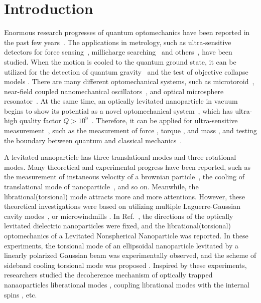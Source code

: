 \documentclass[pra,aps,superscriptaddress,showpacs,preprint]{revtex4}%
\begin{document}
\section{Introduction}
Enormous research progresses of quantum optomechanics have been reported in the past few years~\cite{AspelmeyerRmp2014,KippenbergOe2007}. The applications in metrology, such as ultra-sensitive detectors for force sensing~\cite{RanjitPra2015,RanjitPra2016}, millicharge searching~\cite{MoorePrl2014} and others~\cite{RiderPrl2016,VolpePrl2006,PedaciNphys2010}, have been studied. When the motion is cooled to the quantum ground state, it can be utilized for the detection of quantum gravity~\cite{AlbrechtPra2014} and the test of objective collapse models \cite{Bassi03}. There are many different optomechanical systems, such as microtoroid~\cite{ZhangOe2013}, near-field coupled nanomechanical oscillators~\cite{AnetsbergerNphys2009}, and optical microsphere resonator~\cite{GorodetskyJosab1999}. At the same time, an optically levitated nanoparticle in vacuum begins to show its potential as a novel optomechanical system~\cite{Romero-IsartNjp2010,ChangPnas2010,LiNphys2011,LiScience2010}, which has ultra-high quality factor $Q>10^9$~\cite{LiNphys2011,JainPrl2016}. Therefore, it can be applied for ultra-sensitive measurement~\cite{YinIjmpb2013,LiScience2010}, such as the measurement of force \cite{VolpePrl2006}, torque \cite{VolpePre2007}, and mass \cite{Zhao14}, and testing the boundary between quantum and classical mechanics~\cite{Romero-IsartPrl2011,YinPra2013,Romero-IsartPra2011,Yin2017}.

A levitated nanoparticle has three translational modes and three rotational modes.
Many theoretical and experimental progress have been reported, such as the measurement of instaneous velocity of a brownian particle~\cite{LiScience2010}, the cooling of translational mode of nanoparticle~\cite{ChangPnas2010,LiNphys2011,MillenPrl2015,GieselerPrl2012}, and so on. Meanwhile, the librational(torsional) mode attracts more and more attentions.  However, these theoretical investigations were based on utilizing multiple Laguerre-Gaussian cavity modes~\cite{BhattacharyaPrl2007,Romero-IsartNjp2010,Zhou2017Optical}, or microwindmills \cite{ShiJmo2013}.
In Ref.~\cite{HoangPrl2016,Kuhn17}, the directions of the optically levitated dielectric nanoparticles were fixed, and the librational(torsional) optomechanics of a Levitated Nonspherical Nanoparticle was reported. In these experiments, the torsional mode of an ellipsoidal nanoparticle levitated by a linearly polarized Gaussian beam was experimentally observed, and the scheme of sideband cooling torsional mode was proposed \cite{HoangPrl2016}. Inspired by these experiments, researchers studied the decoherence mechanism of optically trapped nanaoparticles liberational modes \cite{Stickler16a,Zhong2016}, coupling librational modes with the internal spins \cite{Ma2016,Delord2017,nan2008cooling}, etc.
\end{document}

